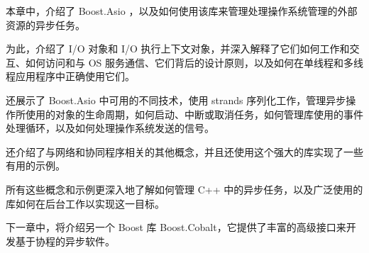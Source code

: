 本章中，介绍了 Boost.Asio ，以及如何使用该库来管理处理操作系统管理的外部资源的异步任务。

为此，介绍了 I/O 对象和 I/O 执行上下文对象，并深入解释了它们如何工作和交互、如何访问和与 OS 服务通信、它们背后的设计原则，以及如何在单线程和多线程应用程序中正确使用它们。

还展示了 Boost.Asio 中可用的不同技术，使用 strands 序列化工作，管理异步操作所使用的对象的生命周期，如何启动、中断或取消任务，如何管理库使用的事件处理循环，以及如何处理操作系统发送的信号。

还介绍了与网络和协同程序相关的其他概念，并且还使用这个强大的库实现了一些有用的示例。

所有这些概念和示例更深入地了解如何管理 C++ 中的异步任务，以及广泛使用的库如何在后台工作以实现这一目标。

下一章中，将介绍另一个 Boost 库 Boost.Cobalt，它提供了丰富的高级接口来开发基于协程的异步软件。